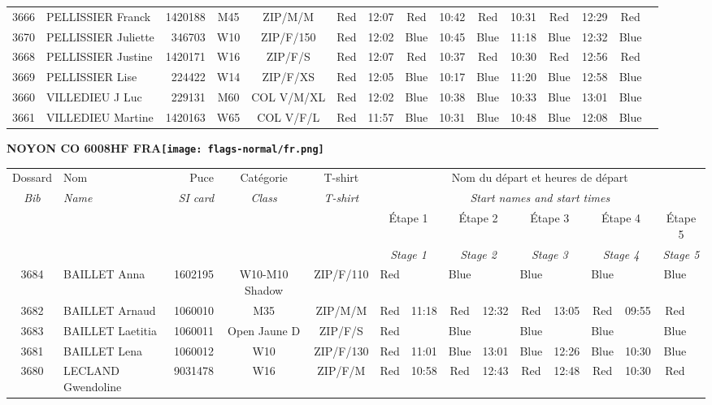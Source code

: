 \documentclass{report}
\begin{document}
\begin{longtable}{|c|l|r|c|c|*{5}{cc|}}
    3666 & PELLISSIER Franck & 1420188 & M45 & ZIP/M/M & Red & 12:07 & Red & 10:42 & Red & 10:31 & Red & 12:29 & Red &  \\
    3670 & PELLISSIER Juliette & 346703 & W10 & ZIP/F/150 & Red & 12:02 & Blue & 10:45 & Blue & 11:18 & Blue & 12:32 & Blue &  \\
    3668 & PELLISSIER Justine & 1420171 & W16 & ZIP/F/S & Red & 12:07 & Red & 10:37 & Red & 10:30 & Red & 12:56 & Red &  \\
    3669 & PELLISSIER Lise & 224422 & W14 & ZIP/F/XS & Red & 12:05 & Blue & 10:17 & Blue & 11:20 & Blue & 12:58 & Blue &  \\
    3660 & VILLEDIEU J Luc & 229131 & M60 & COL V/M/XL & Red & 12:02 & Blue & 10:38 & Blue & 10:33 & Blue & 13:01 & Blue &  \\
    3661 & VILLEDIEU Martine & 1420163 & W65 & COL V/F/L & Red & 11:57 & Blue & 10:31 & Blue & 10:48 & Blue & 12:08 & Blue &  \\
  \end{longtable}
\newpage
  \Huge \centering \bfseries NOYON CO 6008HF FRA\normalfont \footnotesize \sffamily \hfill \texttt{[image: flags-normal/fr.png]} \newline 
  \begin{longtable}{|c|l|r|c|c|*{5}{cc|}}
    Dossard & Nom  & Puce    & Catégorie & T-shirt & \multicolumn{10}{c|}{Nom du départ et heures de départ} \\
    \itshape Bib     & \itshape Name & \itshape SI card & \itshape Class  & \itshape  T-shirt  & \multicolumn{10}{c|}{\itshape Start names and start times} \\
    \hline
    & & & & & \multicolumn{2}{c|}{Étape 1} & \multicolumn{2}{c|}{Étape 2} & \multicolumn{2}{c|}{Étape 3} & \multicolumn{2}{c|}{Étape 4} & \multicolumn{2}{c|}{Étape 5} \\
    & & & & & \multicolumn{2}{c|}{\itshape Stage 1} & \multicolumn{2}{c|}{\itshape Stage 2} & \multicolumn{2}{c|}{\itshape Stage 3} & \multicolumn{2}{c|}{\itshape Stage 4} & \multicolumn{2}{c|}{\itshape Stage 5} \\
    \hline
    3684 & BAILLET Anna & 1602195 & W10-M10 Shadow & ZIP/F/110 & Red &   & Blue &   & Blue &   & Blue &   & Blue &  \\
    3682 & BAILLET Arnaud & 1060010 & M35 & ZIP/M/M & Red & 11:18 & Red & 12:32 & Red & 13:05 & Red & 09:55 & Red &  \\
    3683 & BAILLET Laetitia & 1060011 & Open Jaune D & ZIP/F/S & Red &   & Blue &   & Blue &   & Blue &   & Blue &  \\
    3681 & BAILLET Lena & 1060012 & W10 & ZIP/F/130 & Red & 11:01 & Blue & 13:01 & Blue & 12:26 & Blue & 10:30 & Blue &  \\
    3680 & LECLAND Gwendoline & 9031478 & W16 & ZIP/F/M & Red & 10:58 & Red & 12:43 & Red & 12:48 & Red & 10:30 & Red &  \\
  \end{longtable}
\end{document}
